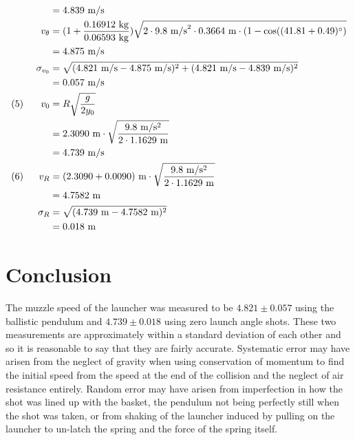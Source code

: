\documentclass[12pt]{article}
\begin{document}
\begin{alignat*}{3}
            &&&=4.839~\mathrm{m/s}\\
            &&v_\theta &= (1+\frac{0.16912~\mathrm{kg}}{0.06593~\mathrm{kg}})\sqrt{2\cdot 9.8~ \mathrm{m/s}^2\cdot 0.3664~\mathrm{m}\cdot(1-\cos((41.81+0.49)\degree)}\\
            &&&= 4.875~\mathrm{m/s}\\
            &&\sigma_{v_0} &= \sqrt{(4.821~\mathrm{m/s}-4.875~\mathrm{m/s})^2+(4.821~\mathrm{m/s}-4.839~\mathrm{m/s})^2}\\
            &&&=0.057~\mathrm{m/s}\\
            (5)~
            &&v_0 &= R\sqrt{\frac{g}{2y_0}}\\
            &&&= 2.3090~\mathrm{m} \cdot \sqrt{\frac{9.8~\mathrm{m/s^2}}{2 \cdot 1.1629~\mathrm{m}}}\\
            &&&=4.739~\mathrm{m/s}\\
            (6)~
            &&v_R &= (2.3090 + 0.0090)~\mathrm{m} \cdot \sqrt{\frac{9.8~\mathrm{m/s^2}}{2 \cdot 1.1629~\mathrm{m}}}\\
            &&&=4.7582~\mathrm{m}\\
            &&\sigma_R &= \sqrt{(4.739~\mathrm{m}-4.7582~\mathrm{m})^2}\\
            &&&= 0.018 ~\mathrm{m}
        \end{alignat*}
    \section{Conclusion}
        The muzzle speed of the launcher was measured to be \(4.821\pm 0.057\) using the ballistic pendulum and \(4.739\pm 0.018 \) using zero launch angle shots. These two measurements are approximately within a standard deviation of each other and so it is reasonable to say that they are fairly accurate. Systematic error may have arisen from the neglect of gravity when using conservation of momentum to find the initial speed from the speed at the end of the collision and the neglect of air resistance entirely. Random error may have arisen from imperfection in how the shot was lined up with the basket, the pendulum not being perfectly still when the shot was taken, or from shaking of the launcher induced by pulling on the launcher to un-latch the spring and the force of the spring itself.
\end{document}
